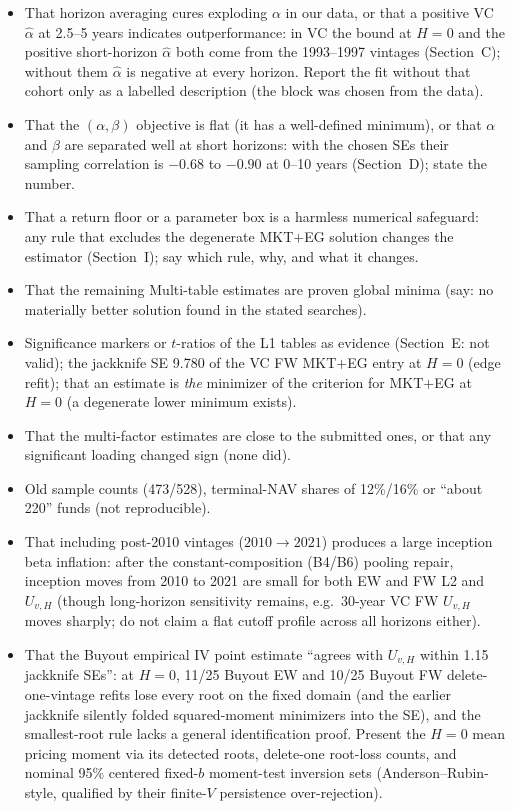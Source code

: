 \documentclass[11pt]{article}
\begin{document}
\begin{itemize}
\item That horizon averaging cures exploding $\alpha$ in our data, or that a positive VC $\hat\alpha$ at 2.5--5 years indicates outperformance: in VC the bound at $H=0$ and the positive short-horizon $\hat\alpha$ both come from the 1993--1997 vintages (Section~C); without them $\hat\alpha$ is negative at every horizon. Report the fit without that cohort only as a labelled description (the block was chosen from the data).
\item That the $(\alpha,\beta)$ objective is flat (it has a well-defined minimum), or that $\alpha$ and $\beta$ are separated well at short horizons: with the chosen SEs their sampling correlation is $-0.68$ to $-0.90$ at 0--10 years (Section~D); state the number.
\item That a return floor or a parameter box is a harmless numerical safeguard: any rule that excludes the degenerate MKT$+$EG solution changes the estimator (Section~I); say which rule, why, and what it changes.
\item That the remaining Multi-table estimates are proven global minima (say: no materially better solution found in the stated searches).
\item Significance markers or $t$-ratios of the L1 tables as evidence (Section~E: not valid); the jackknife SE 9.780 of the VC FW MKT$+$EG entry at $H=0$ (edge refit); that an estimate is \emph{the} minimizer of the criterion for MKT$+$EG at $H=0$ (a degenerate lower minimum exists).
\item That the multi-factor estimates are close to the submitted ones, or that any significant loading changed sign (none did).
\item Old sample counts (473/528), terminal-NAV shares of 12\%/16\% or ``about 220'' funds (not reproducible).
\item That including post-2010 vintages ($2010\to2021$) produces a large inception beta inflation: after the constant-composition (B4/B6) pooling repair, inception moves from 2010 to 2021 are small for both EW and FW L2 and $U_{v,H}$ (though long-horizon sensitivity remains, e.g.\ 30-year VC FW $U_{v,H}$ moves sharply; do not claim a flat cutoff profile across all horizons either).
\item That the Buyout empirical IV point estimate ``agrees with $U_{v,H}$ within 1.15 jackknife SEs'': at $H=0$, 11/25 Buyout EW and 10/25 Buyout FW delete-one-vintage refits lose every root on the fixed domain (and the earlier jackknife silently folded squared-moment minimizers into the SE), and the smallest-root rule lacks a general identification proof. Present the $H=0$ mean pricing moment via its detected roots, delete-one root-loss counts, and nominal 95\% centered fixed-$b$ moment-test inversion sets (Anderson--Rubin-style, qualified by their finite-$V$ persistence over-rejection).
\end{itemize}
\end{document}
